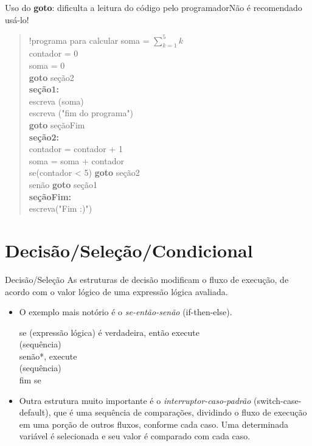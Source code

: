 \documentclass{beamer}%
\def\azul{\color{blue!90!black}}
\begin{document}
\begin{frame}{Uso do \textbf{goto}: dificulta a leitura do código pelo programador}{Não é recomendado usá-lo!}
\begin{quote}\small
!programa para calcular soma = $\textstyle\sum_{k=1}^{5}k$\\
contador = 0\\
soma = 0\\
\textbf{goto} seção2\\
\textbf{seção1:}\\
escreva (soma)\qquad\qquad\qquad\qquad\!\!\!\! \\
escreva ("fim do programa") \qquad {}\\
\textbf{goto} seçãoFim\\
\textbf{seção2:}\\
contador = contador + 1\\
soma = soma + contador\\
se(contador < 5) \textbf{goto} seção2\\
senão \textbf{goto} seção1\\
\textbf{seçãoFim:}\\
escreva("Fim :)")\qquad\qquad\qquad\quad {}
\end{quote}
\end{frame}




\section[Seleção]{Decisão/Seleção/Condicional}
\begin{frame}{Decisão/Seleção}
As estruturas de decisão modificam o fluxo de execução, de acordo
com o valor lógico de uma expressão lógica avaliada.
\begin{itemize}\justifying
\item O exemplo mais
notório é o \textit{se-então-senão} (if-then-else).

{\azul se (expressão lógica) é verdadeira, então execute\\
\qquad    (sequência)\\
senão*, execute\\
\qquad    (sequência)\\
fim se}

\item Outra estrutura muito importante é o \textit{interruptor-caso-padrão}
(switch-case-default), que é uma sequência de comparações,
dividindo o fluxo de execução em uma porção de outros fluxos,
conforme cada caso. Uma determinada variável é selecionada e seu
valor é comparado com cada caso.
\end{itemize}

\end{frame}
\end{document}
